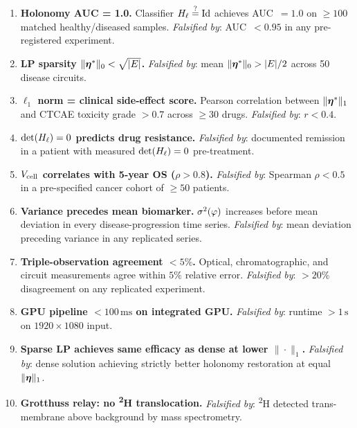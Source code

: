\begin{enumerate}[label=\textbf{P\arabic*.}, leftmargin=3em]

\item \textbf{Holonomy AUC = 1.0.}
  Classifier $H_\ell \stackrel{?}{=}\mathrm{Id}$ achieves AUC~$=1.0$ on
  $\geq 100$ matched healthy/diseased samples.
  \emph{Falsified by}: AUC~$< 0.95$ in any pre-registered experiment.

\item \textbf{LP sparsity $\|\boldsymbol{\eta}^*\|_0 < \sqrt{|E|}$.}
  \emph{Falsified by}: mean $\|\boldsymbol{\eta}^*\|_0 > |E|/2$ across 50 disease
  circuits.

\item \textbf{$\ell_1$ norm = clinical side-effect score.}
  Pearson correlation between $\|\boldsymbol{\eta}^*\|_1$ and CTCAE toxicity grade
  $> 0.7$ across $\geq 30$ drugs.
  \emph{Falsified by}: $r < 0.4$.

\item \textbf{$\det(H_\ell) = 0$ predicts drug resistance.}
  \emph{Falsified by}: documented remission in a patient with measured
  $\det(H_\ell) = 0$ pre-treatment.

\item \textbf{$V_{\mathrm{cell}}$ correlates with 5-year OS ($\rho > 0.8$).}
  \emph{Falsified by}: Spearman $\rho < 0.5$ in a pre-specified cancer cohort
  of $\geq 50$ patients.

\item \textbf{Variance precedes mean biomarker.}
  $\sigma^2(\varphi)$ increases before mean deviation in every
  disease-progression time series.
  \emph{Falsified by}: mean deviation preceding variance in any replicated
  series.

\item \textbf{Triple-observation agreement $<5\%$.}
  Optical, chromatographic, and circuit measurements agree within $5\%$
  relative error.
  \emph{Falsified by}: $>20\%$ disagreement on any replicated experiment.

\item \textbf{GPU pipeline $< 100\,\mathrm{ms}$ on integrated GPU.}
  \emph{Falsified by}: runtime $>1\,\mathrm{s}$ on $1920\times1080$ input.

\item \textbf{Sparse LP achieves same efficacy as dense at lower
  $\|\cdot\|_1$.}
  \emph{Falsified by}: dense solution achieving strictly better holonomy
  restoration at equal $\|\boldsymbol{\eta}\|_1$.

\item \textbf{Grotthuss relay: no \textsuperscript{2}H translocation.}
  \emph{Falsified by}: \textsuperscript{2}H detected trans-membrane above
  background by mass spectrometry.


\end{enumerate}
